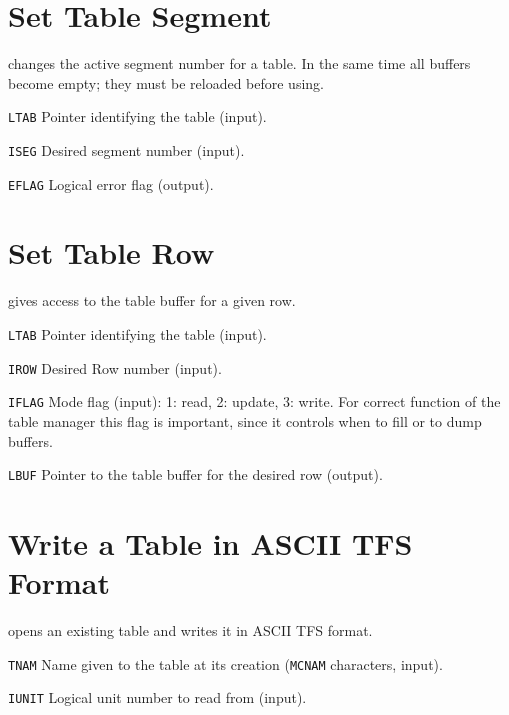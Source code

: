 \section{Set Table Segment}
\label{TBSEG}
changes the active segment number for a table.
In the same time all buffers become empty;
they must be reloaded before using.
\begin{mylist}
\item[\tt LTAB]
Pointer identifying the table (input).
\item[\tt ISEG]
Desired segment number (input).
\item[\tt EFLAG]
Logical error flag (output).
\end{mylist}

\section{Set Table Row}
\label{TBSET}
gives access to the table buffer for a given row.
\begin{mylist}
\item[\tt LTAB]
Pointer identifying the table (input).
\item[\tt IROW]
Desired Row number (input).
\item[\tt IFLAG]
Mode flag (input):
1: read, 2: update, 3: write.
For correct function of the table manager this flag is important,
since it controls when to fill or to dump buffers.
\item[\tt LBUF]
Pointer to the table buffer for the desired row (output).
\end{mylist}

\section{Write a Table in ASCII TFS Format}
\label{TBWTFS}
opens an existing table and writes it in ASCII TFS format.
\begin{mylist}
\item[\tt TNAM]
Name given to the table at its creation ({\tt MCNAM} characters, input).
\item[\tt IUNIT]
Logical unit number to read from (input).
\end{mylist}

                                         
